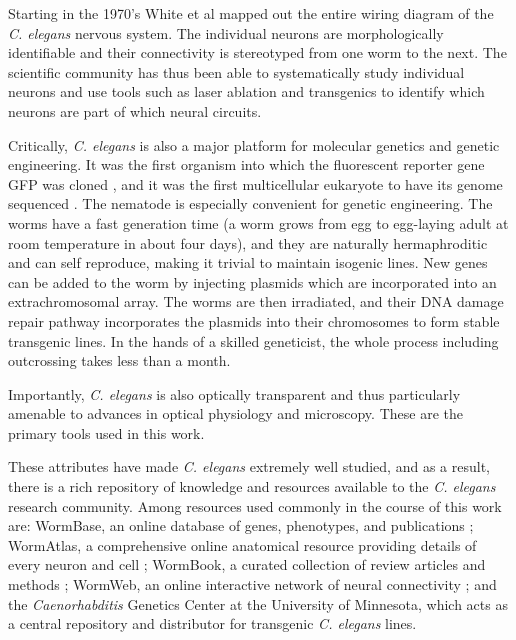Starting in the 1970's White et al \citep{white_structure_1976, white_structure_1986}  mapped out the entire wiring diagram of the \textit{C. elegans} nervous system. The individual neurons are morphologically identifiable and their connectivity is stereotyped from one worm to the next. The  scientific community has thus been able to systematically study individual neurons and use tools such as laser ablation and transgenics to identify which neurons are part of which neural circuits. 

Critically, \textit{C. elegans} is also a major platform for molecular genetics and genetic engineering. It was the first organism into which the fluorescent reporter gene GFP was cloned \citep{chalfie_green_1994},  and it was the first multicellular eukaryote to have its genome sequenced \citep{sulston_c._1992,_genome_1998}. The nematode is especially convenient for genetic engineering. The worms have a fast generation time (a worm grows from egg to egg-laying adult at room temperature in about four days), and they are naturally hermaphroditic and can self reproduce,  making it trivial to maintain isogenic lines. New genes can be added to the worm by injecting plasmids which are incorporated into an extrachromosomal array. The worms are then irradiated, and their DNA damage repair pathway incorporates the plasmids into their chromosomes to form stable transgenic lines.  In the hands of a skilled geneticist, the whole process including outcrossing takes less than a month. 

Importantly, \textit{C. elegans} is also optically transparent and thus particularly amenable to advances in optical physiology and microscopy. These are the primary tools used in this work. 

These attributes have made  \textit{C. elegans}  extremely well studied, and as a result, there is a rich repository of knowledge and resources available to the \textit{C. elegans} research community. Among resources used commonly in the course of this work are:  WormBase, an online database of genes, phenotypes, and publications \citep{harris_wormbase:_2010}; WormAtlas, a comprehensive online anatomical resource providing details of every neuron and cell \citep{altun_wormatlas_2002}; WormBook, a curated collection of review articles and methods \citep{the_c._elegans_research_community_wormbook_2011}; WormWeb, an online interactive network of neural connectivity \citep{bhatla_c._2009};  and the \textit{Caenorhabditis} Genetics Center at the University of Minnesota, which acts as a central repository and distributor for transgenic \textit{C. elegans} lines.



